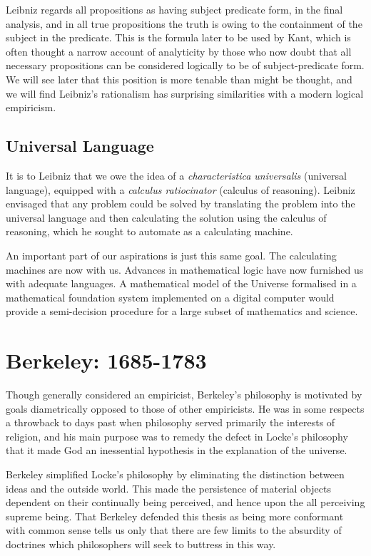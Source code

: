 Leibniz regards all propositions as having subject predicate form, in the final analysis, and in all true propositions the truth is owing to the containment of the subject in the predicate.
This is the formula later to be used by Kant, which is often thought a narrow account of analyticity by those who now doubt that all necessary propositions can be considered logically to be of subject-predicate form.
We will see later that this position is more tenable than might be thought, and we will find Leibniz's rationalism has surprising similarities with a modern logical empiricism.


\subsection{Universal Language}

It is to Leibniz that we owe the idea of a {\it characteristica universalis} (universal language), equipped with a {\it calculus ratiocinator} (calculus of reasoning).
Leibniz envisaged that any problem could be solved by translating the problem into the universal language and then calculating the solution using the calculus of reasoning, which he sought to automate as a calculating machine.

An important part of our aspirations is just this same goal.
The calculating machines are now with us.
Advances in mathematical logic have now furnished us with adequate languages.
A mathematical model of the Universe formalised in a mathematical foundation system implemented on a digital computer would provide a semi-decision procedure for a large subset of mathematics and science.


\section{Berkeley: 1685-1783}

Though generally considered an empiricist, Berkeley's philosophy is motivated by goals diametrically opposed to those of other empiricists.
He was in some respects a throwback to days past when philosophy served primarily the interests of religion, and his main purpose was to remedy the defect in Locke's philosophy that it made God an inessential hypothesis in the explanation of the universe.

Berkeley simplified Locke's philosophy by eliminating the distinction between ideas and the outside world.
This made the persistence of material objects dependent on their continually being perceived, and hence upon the all perceiving supreme being.
That Berkeley defended this thesis as being more conformant with common sense tells us only that there are few limits to the absurdity of doctrines which philosophers will seek to buttress in this way.

